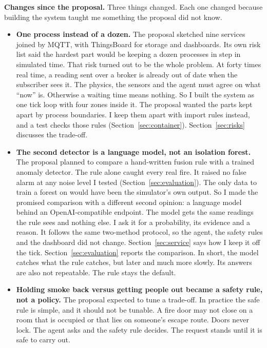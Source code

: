 \textbf{Changes since the proposal.} Three things changed. Each one changed because
building the system taught me something the proposal did not know.

\begin{itemize}[leftmargin=1.4em, itemsep=2pt]
\item \textbf{One process instead of a dozen.} The proposal sketched nine services
  joined by MQTT, with ThingsBoard for storage and dashboards. Its own risk list said
  the hardest part would be keeping a dozen processes in step in simulated time.
  That risk turned out to be the whole problem. At forty times real time, a reading
  sent over a broker is already out of date when the subscriber sees it. The
  physics, the sensors and the agent must agree on what ``now'' is. Otherwise a
  waiting time means nothing. So I built the system as one tick loop with four zones
  inside it. The proposal wanted the parts kept apart by process boundaries. I keep
  them apart with import rules instead, and a test checks those rules
  (Section~\ref{sec:container}). Section~\ref{sec:risks} discusses the trade-off.
\item \textbf{The second detector is a language model, not an isolation forest.}
  The proposal planned to compare a hand-written fusion rule with a trained
  anomaly detector. The rule alone caught every real fire. It raised no false alarm
  at any noise level I tested (Section~\ref{sec:evaluation}). The only data to
  train a forest on would have been the simulator's own output. So I made the
  promised comparison with a different second opinion: a language model behind an
  OpenAI-compatible endpoint. The model gets the same readings the rule sees and
  nothing else. I ask it for a probability, its evidence and a reason. It follows
  the same two-method protocol, so the agent, the safety rules and the dashboard did
  not change. Section~\ref{sec:service} says how I keep it off the tick.
  Section~\ref{sec:evaluation} reports the comparison. In short, the model catches
  what the rule catches, but later and much more slowly. Its answers are also not
  repeatable. The rule stays the default.
\item \textbf{Holding smoke back versus getting people out became a safety rule, not a policy.}
  The proposal expected to tune a trade-off. In practice the safe rule is simple,
  and it should not be tunable. A fire door may not close on a room that is occupied
  or that lies on someone's escape route. Doors never lock. The agent asks and the
  safety rule decides. The request stands until it is safe to carry out.
\end{itemize}

